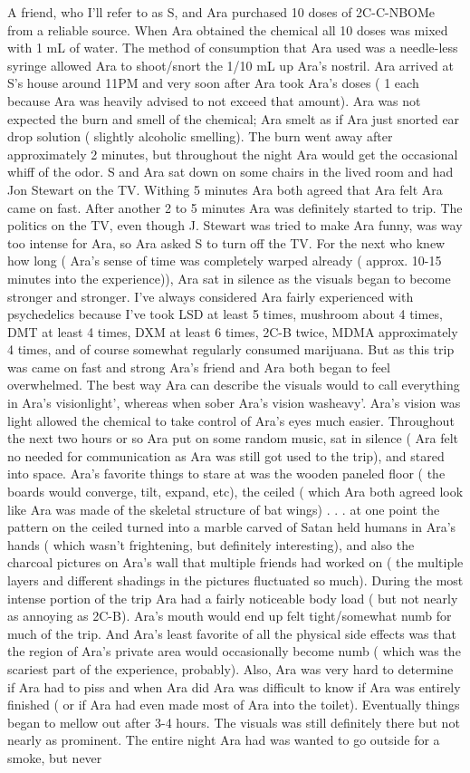 \documentclass[12pt]{book}
\begin{document}
A friend, who I'll refer to as S, and Ara purchased 10 doses of 2C-C-NBOMe from a reliable source. When Ara obtained the chemical all 10 doses was mixed with 1 mL of water. The method of consumption that Ara used was a needle-less syringe allowed Ara to shoot/snort the 1/10 mL up Ara's nostril. Ara arrived at S's house around 11PM and very soon after Ara took Ara's doses ( 1 each because Ara was heavily advised to not exceed that amount). Ara was not expected the burn and smell of the chemical; Ara smelt as if Ara just snorted ear drop solution ( slightly alcoholic smelling). The burn went away after approximately 2 minutes, but throughout the night Ara would get the occasional whiff of the odor. S and Ara sat down on some chairs in the lived room and had Jon Stewart on the TV. Withing 5 minutes Ara both agreed that Ara felt Ara came on fast. After another 2 to 5 minutes Ara was definitely started to trip. The politics on the TV, even though J. Stewart was tried to make Ara funny, was way too intense for Ara, so Ara asked S to turn off the TV. For the next who knew how long ( Ara's sense of time was completely warped already ( approx. 10-15 minutes into the experience)), Ara sat in silence as the visuals began to become stronger and stronger. I've always considered Ara fairly experienced with psychedelics because I've took LSD at least 5 times, mushroom about 4 times, DMT at least 4 times, DXM at least 6 times, 2C-B twice, MDMA approximately 4 times, and of course somewhat regularly consumed marijuana. But as this trip was came on fast and strong Ara's friend and Ara both began to feel overwhelmed. The best way Ara can describe the visuals would to call everything in Ara's visionlight', whereas when sober Ara's vision washeavy'. Ara's vision was light allowed the chemical to take control of Ara's eyes much easier. Throughout the next two hours or so Ara put on some random music, sat in silence ( Ara felt no needed for communication as Ara was still got used to the trip), and stared into space. Ara's favorite things to stare at was the wooden paneled floor ( the boards would converge, tilt, expand, etc), the ceiled ( which Ara both agreed look like Ara was made of the skeletal structure of bat wings) . . .  at one point the pattern on the ceiled turned into a marble carved of Satan held humans in Ara's hands ( which wasn't frightening, but definitely interesting), and also the charcoal pictures on Ara's wall that multiple friends had worked on ( the multiple layers and different shadings in the pictures fluctuated so much). During the most intense portion of the trip Ara had a fairly noticeable body load ( but not nearly as annoying as 2C-B). Ara's mouth would end up felt tight/somewhat numb for much of the trip. And Ara's least favorite of all the physical side effects was that the region of Ara's private area would occasionally become numb ( which was the scariest part of the experience, probably). Also, Ara was very hard to determine if Ara had to piss and when Ara did Ara was difficult to know if Ara was entirely finished ( or if Ara had even made most of Ara into the toilet). Eventually things began to mellow out after 3-4 hours. The visuals was still definitely there but not nearly as prominent. The entire night Ara had was wanted to go outside for a smoke, but never 
\end{document}
